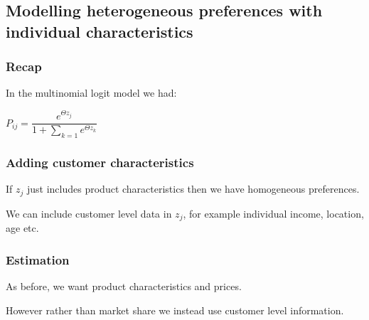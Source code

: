 
\subsection{Modelling heterogeneous preferences with individual characteristics}

\subsubsection{Recap}

In the multinomial logit model we had:

\(P_{ij}=\dfrac{e^{\Theta z_j}}{1+\sum_{k=1} e^{\Theta z_k }}\)

\subsubsection{Adding customer characteristics}

If \(z_j\) just includes product characteristics then we have homogeneous preferences.

We can include customer level data in \(z_j\), for example individual income, location, age etc.

\subsubsection{Estimation}

As before, we want product characteristics and prices.

However rather than market share we instead use customer level  information.

